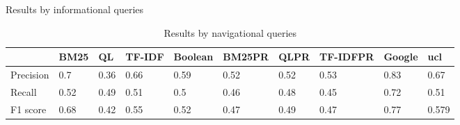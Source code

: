 \begin{table*}[!t]
    \begin{subtable}{.5\textwidth}
    \centering
    \caption{Results by informational queries}
    \label{inform}
    \resizebox{\columnwidth}{!}
    {
      \begin{tabular}{|l|l|l|l|l|l|l|l|l|l|}
      \hline
                & BM25  & QL & TF-IDF &Boolean& BM25PR &QLPR&TF-IDFPR&Google&ucl  \\ \hline
      Precision & 0.7  & 0.36  & 0.66 & 0.59 &0.52&0.52&0.53&0.83&0.67 \\ \hline
      Recall    & 0.52& 0.49   & 0.51 & 0.5 &0.46&0.48&0.45&0.72&0.51 \\ \hline
      F1 score  & 0.68 & 0.42   & 0.55  & 0.52&0.47&0.49&0.47&0.77&0.579\\ \hline
      \end{tabular}
    }
    \end{subtable}%
    \begin{subtable}{.5\textwidth}
    \centering
    \caption{Results by navigational queries}


\end{subtable}
\end{table*}

